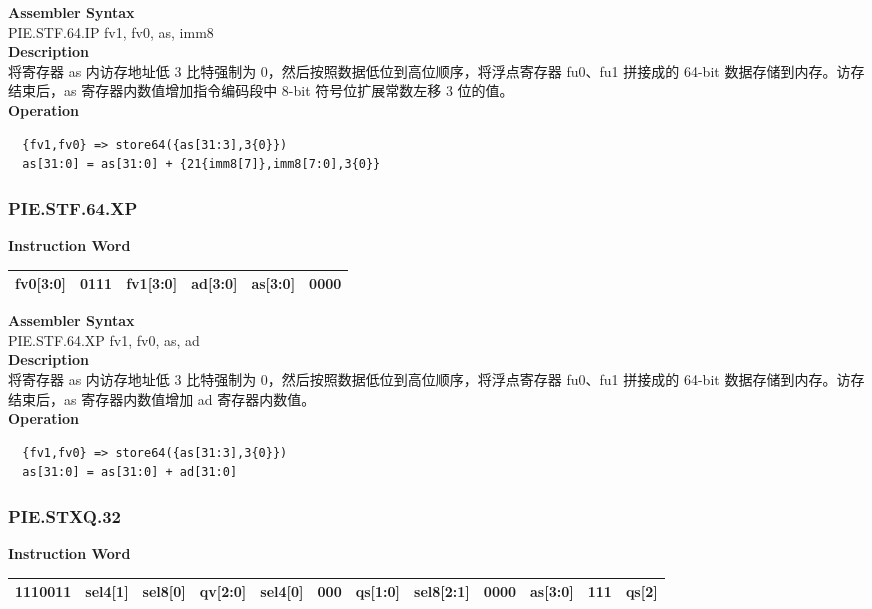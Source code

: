 \textbf{Assembler Syntax} \\
PIE.STF.64.IP fv1, fv0, as, imm8 \\
\textbf{Description} \\
将寄存器 as 内访存地址低 3 比特强制为 0，然后按照数据低位到高位顺序，将浮点寄存器 fu0、fu1 拼接成的 64-bit 数据存储到内存。访存结束后，as 寄存器内数值增加指令编码段中 8-bit 符号位扩展常数左移 3 位的值。\\
\textbf{Operation}
\begin{lstlisting}
  {fv1,fv0} => store64({as[31:3],3{0}})
  as[31:0] = as[31:0] + {21{imm8[7]},imm8[7:0],3{0}}
\end{lstlisting}

\newpage
\subsubsection{PIE.STF.64.XP}\label{instruction:PIESTF64XP}
\setlength\tabcolsep{6pt}
\textbf{Instruction Word} \\
\begin{tabular}{|c|c|c|c|c|c|}
	\hline
	fv0[3:0] & 0111 & fv1[3:0] & ad[3:0] & as[3:0] & 0000 \\
	\hline
\end{tabular}

\textbf{Assembler Syntax} \\
PIE.STF.64.XP fv1, fv0, as, ad \\
\textbf{Description} \\
将寄存器 as 内访存地址低 3 比特强制为 0，然后按照数据低位到高位顺序，将浮点寄存器 fu0、fu1 拼接成的 64-bit 数据存储到内存。访存结束后，as 寄存器内数值增加 ad 寄存器内数值。\\
\textbf{Operation}
\begin{lstlisting}
  {fv1,fv0} => store64({as[31:3],3{0}})
  as[31:0] = as[31:0] + ad[31:0]
\end{lstlisting}

\newpage
\subsubsection{PIE.STXQ.32}\label{instruction:PIESTXQ32}
\setlength\tabcolsep{6pt}
\textbf{Instruction Word} \\
\begin{tabular}{|c|c|c|c|c|c|c|c|c|c|c|c|}
	\hline
	1110011 & sel4[1] & sel8[0] & qv[2:0] & sel4[0] & 000 & qs[1:0] & sel8[2:1] & 0000 & as[3:0] & 111 & qs[2] \\
	\hline
\end{tabular}

